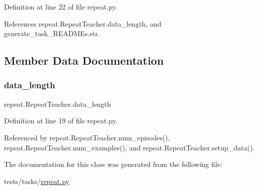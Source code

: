 Definition at line 22 of file repeat.\+py.



References repeat.\+Repeat\+Teacher.\+data\+\_\+length, and generate\+\_\+task\+\_\+\+R\+E\+A\+D\+M\+Es.\+str.



\subsection{Member Data Documentation}
\mbox{\label{classrepeat_1_1RepeatTeacher_abc46f01649c8af2c60124d7946a95e98}} 
\subsubsection{\texorpdfstring{data\+\_\+length}{data\_length}}
{\footnotesize\ttfamily repeat.\+Repeat\+Teacher.\+data\+\_\+length}



Definition at line 19 of file repeat.\+py.



Referenced by repeat.\+Repeat\+Teacher.\+num\+\_\+episodes(), repeat.\+Repeat\+Teacher.\+num\+\_\+examples(), and repeat.\+Repeat\+Teacher.\+setup\+\_\+data().



The documentation for this class was generated from the following file\+:\begin{DoxyCompactItemize}
\item 
tests/tasks/\hyperlink{repeat_8py}{repeat.\+py}\end{DoxyCompactItemize}
